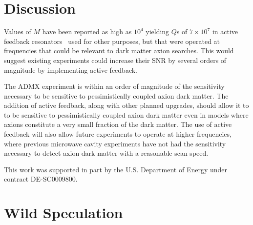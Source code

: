 \documentclass[aps,prl,twocolumn,groupedaddress]{revtex4-1}
\begin{document}
\section{Discussion}
Values of $M$ have been reported as high as $10^4$ yielding $Q$s of $7\times10^7$ in active feedback resonators~\cite{:/content/aip/journal/rsi/84/8/10.1063/1.4817537} used for other purposes, but that were operated at frequencies that could be relevant to dark matter axion searches.
This would suggest existing experiments could increase their SNR by several orders of magnitude by implementing active feedback.

The ADMX experiment is within an order of magnitude of the sensitivity necessary to be sensitive to pessimistically coupled axion dark matter.  The addition of active feedback, along with other planned upgrades, should allow it to to be sensitive to pessimistically coupled axion dark matter even in models where axions constitute a very small fraction of the dark matter.  The use of active feedback will also allow future experiments to operate at higher frequencies, where previous microwave cavity experiments have not had the sensitivity necessary to detect axion dark matter with a reasonable scan speed.

This work was supported in part by the U.S. Department of Energy under contract DE-SC0009800.

\section{Wild Speculation}


\end{document}
